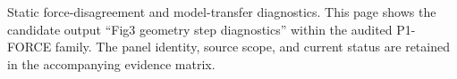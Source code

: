 Static force-disagreement and model-transfer diagnostics. This page shows the candidate output ``Fig3 geometry step diagnostics'' within the audited P1-FORCE family. The panel identity, source scope, and current status are retained in the accompanying evidence matrix.

